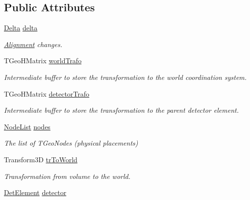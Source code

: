 \subsection*{Public Attributes}
\begin{DoxyCompactItemize}
\item 
\hyperlink{class_d_d4hep_1_1_alignments_1_1_alignment_data_a3e67a5cbb3449006e9552b0f7bd98d45}{Delta} \hyperlink{class_d_d4hep_1_1_alignments_1_1_alignment_data_add24423a741867fc3d3954ee65ec3636}{delta}
\begin{DoxyCompactList}\small\item\em \hyperlink{class_d_d4hep_1_1_alignments_1_1_alignment}{Alignment} changes. \end{DoxyCompactList}\item 
T\+Geo\+H\+Matrix \hyperlink{class_d_d4hep_1_1_alignments_1_1_alignment_data_a87234aee58d8e087377b029de83ebcd8}{world\+Trafo}
\begin{DoxyCompactList}\small\item\em Intermediate buffer to store the transformation to the world coordination system. \end{DoxyCompactList}\item 
T\+Geo\+H\+Matrix \hyperlink{class_d_d4hep_1_1_alignments_1_1_alignment_data_a7c01e8657259af3afa97d01c4d7d1733}{detector\+Trafo}
\begin{DoxyCompactList}\small\item\em Intermediate buffer to store the transformation to the parent detector element. \end{DoxyCompactList}\item 
\hyperlink{class_d_d4hep_1_1_alignments_1_1_alignment_data_a3a667fd798d7523d75accee832d64521}{Node\+List} \hyperlink{class_d_d4hep_1_1_alignments_1_1_alignment_data_ae7f0952d17a85f1061aa0b2967aff0ab}{nodes}
\begin{DoxyCompactList}\small\item\em The list of T\+Geo\+Nodes (physical placements) \end{DoxyCompactList}\item 
Transform3D \hyperlink{class_d_d4hep_1_1_alignments_1_1_alignment_data_a468b2dee055c6e6894ae65d37a53712e}{tr\+To\+World}
\begin{DoxyCompactList}\small\item\em Transformation from volume to the world. \end{DoxyCompactList}\item 
\hyperlink{class_d_d4hep_1_1_geometry_1_1_det_element}{Det\+Element} \hyperlink{class_d_d4hep_1_1_alignments_1_1_alignment_data_abf7096d1f2d3ed307c361f2d6d03710e}{detector}

\end{DoxyCompactItemize}
